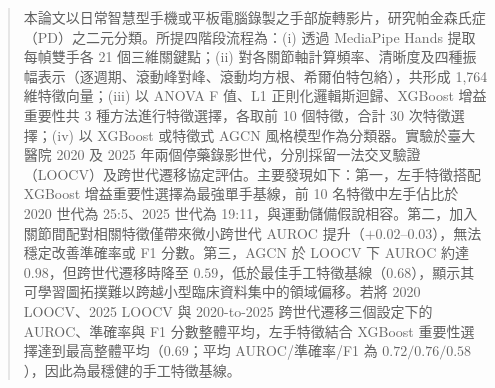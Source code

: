 
\begin{abstract}
\setlength{\parskip}{4pt}

本論文以日常智慧型手機或平板電腦錄製之手部旋轉影片，研究帕金森氏症（PD）之二元分類。所提四階段流程為：(i) 透過 MediaPipe Hands 提取每幀雙手各 21 個三維關鍵點；(ii) 對各關節軸計算頻率、清晰度及四種振幅表示（逐週期、滾動峰對峰、滾動均方根、希爾伯特包絡），共形成 1,764 維特徵向量；(iii) 以 ANOVA F 值、L1 正則化邏輯斯迴歸、XGBoost 增益重要性共 3 種方法進行特徵選擇，各取前 10 個特徵，合計 30 次特徵選擇；(iv) 以 XGBoost 或特徵式 AGCN 風格模型作為分類器。實驗於臺大醫院 2020 及 2025 年兩個停藥錄影世代，分別採留一法交叉驗證（LOOCV）及跨世代遷移協定評估。主要發現如下：第一，左手特徵搭配 XGBoost 增益重要性選擇為最強單手基線，前 10 名特徵中左手佔比於 2020 世代為 25:5、2025 世代為 19:11，與運動儲備假說相容。第二，加入關節間配對相關特徵僅帶來微小跨世代 AUROC 提升（$+0.02$--$0.03$），無法穩定改善準確率或 F1 分數。第三，AGCN 於 LOOCV 下 AUROC 約達 $0.98$，但跨世代遷移時降至 $0.59$，低於最佳手工特徵基線（$0.68$），顯示其可學習圖拓撲難以跨越小型臨床資料集中的領域偏移。若將 2020 LOOCV、2025 LOOCV 與 2020-to-2025 跨世代遷移三個設定下的 AUROC、準確率與 F1 分數整體平均，左手特徵結合 XGBoost 重要性選擇達到最高整體平均（$0.69$；平均 AUROC/準確率/F1 為 $0.72/0.76/0.58$），因此為最穩健的手工特徵基線。

\end{abstract}

